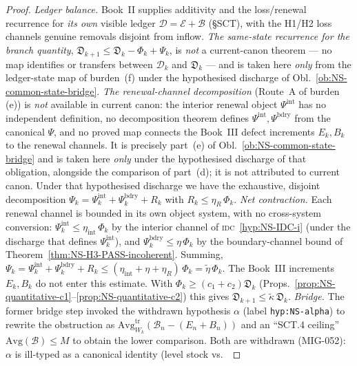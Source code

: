 \documentclass[12pt,oneside]{amsbook}
\theoremstyle{plain}
\theoremstyle{definition}
\theoremstyle{remark}
\begin{document}
\begin{proof}
\emph{Ledger balance.} Book~II supplies additivity and the
loss/renewal recurrence for \emph{its own} visible ledger
$\mathcal{D}=\mathcal{E}+\mathcal{B}$ (\S SCT), with the H1/H2
loss channels genuine removals disjoint from inflow. \emph{The
same-state recurrence for the branch quantity},
$\mathfrak{D}_{k+1} \leq \mathfrak{D}_k - \Phi_k + \Psi_k$, is
\emph{not} a current-canon theorem --- no map identifies or
transfers between $\mathcal{D}_k$ and $\mathfrak{D}_k$ --- and is
taken here \emph{only} from the ledger-state map of burden~(f)
under the hypothesised discharge of
Obl.~\ref{ob:NS-common-state-bridge}.
\emph{The renewal-channel decomposition} (Route~A of burden (e))
is \emph{not} available in current canon: the interior renewal
object $\Psi^{\mathrm{int}}$ has no independent definition, no
decomposition theorem defines
$\Psi^{\mathrm{int}}, \Psi^{\mathrm{bdry}}$ from the canonical
$\Psi$, and no proved map connects the Book~III defect increments
$E_k, B_k$ to the renewal channels. It is precisely part~(e) of
Obl.~\ref{ob:NS-common-state-bridge} and is taken here \emph{only}
under the hypothesised discharge of that obligation, alongside the
comparison of part~(d); it is not attributed to current canon.
Under that hypothesised discharge we have the exhaustive, disjoint
decomposition
$\Psi_k = \Psi_k^{\mathrm{int}} + \Psi_k^{\mathrm{bdry}} + R_k$
with $R_k \leq \eta_R\,\Phi_k$.
\emph{Net contraction.} Each renewal channel is bounded in its own
object system, with no cross-system conversion:
$\Psi_k^{\mathrm{int}} \leq \eta_{\mathrm{int}}\,\Phi_k$ by the
interior channel of \textsc{idc}~\eqref{hyp:NS-IDC-i} (under the
discharge that defines $\Psi_k^{\mathrm{int}}$), and
$\Psi_k^{\mathrm{bdry}} \leq \eta\,\Phi_k$ by the
boundary-channel bound of
Theorem~\ref{thm:NS-H3-PASS-incoherent}. Summing,
$\Psi_k = \Psi_k^{\mathrm{int}} + \Psi_k^{\mathrm{bdry}} + R_k
\leq (\eta_{\mathrm{int}} + \eta + \eta_R)\,\Phi_k
= \widetilde\eta\,\Phi_k$. The Book~III increments $E_k, B_k$ do
not enter this estimate. With
$\Phi_k \geq (c_1+c_2)\mathfrak{D}_k$
(Props.~\ref{prop:NS-quantitative-c1}--\ref{prop:NS-quantitative-c2})
this gives $\mathfrak{D}_{k+1} \leq \widetilde\kappa\,
\mathfrak{D}_k$.
\emph{Bridge.} The former bridge step invoked the withdrawn
hypothesis $\alpha$ (label \texttt{hyp:NS-alpha}) to rewrite the
obstruction as
$\mathrm{Avg}^{\mathrm{tr}}_{W_k}(\mathcal{B}_n - (E_n+B_n))$
and an ``SCT.4 ceiling'' $\mathrm{Avg}(\mathcal{B}) \leq M$ to
obtain the lower comparison. Both are withdrawn (MIG-052):
$\alpha$ is ill-typed as a canonical identity (level stock vs.\

\end{proof}
\end{document}
